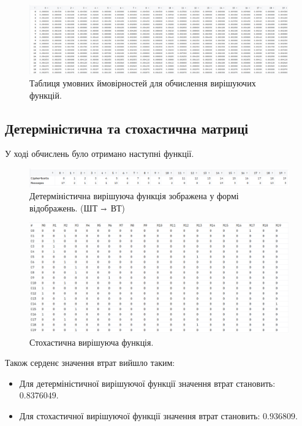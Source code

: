\begin{figure}[h]
    \centering
    \includegraphics[scale = 0.25]{Images/conditional_prob}
    \caption{Таблиця умовних ймовірностей для обчислення вирішуючих функцій.}
    \label{fig:twisted_edward}
\end{figure}


\subsection{Детерміністична та стохастична матриці}
У ході обчислень було отримано наступні функції.

\begin{figure}[h]
    \centering
    \includegraphics[scale = 0.37]{Images/deterministic}
    \caption{Детерміністична вирішуюча функція зображена у формі відображень. (ШТ $\shortrightarrow$ ВТ) }
    \label{fig:twisted_edward}
\end{figure}

\begin{figure}[h]
    \centering
    \includegraphics[scale = 0.3]{Images/stochastic_decidable_function}
    \caption{Стохастична вирішуюча функція.}
    \label{fig:twisted_edward}
\end{figure}

Також серденє значення втрат вийшло таким:
\begin{itemize}
	\item Для детерміністичної вирішуючої функції значення втрат становить: $0.8376049$.
	\item Для стохастичної вирішуючої функції значення втрат становить: $0.936809$.
\end{itemize}

